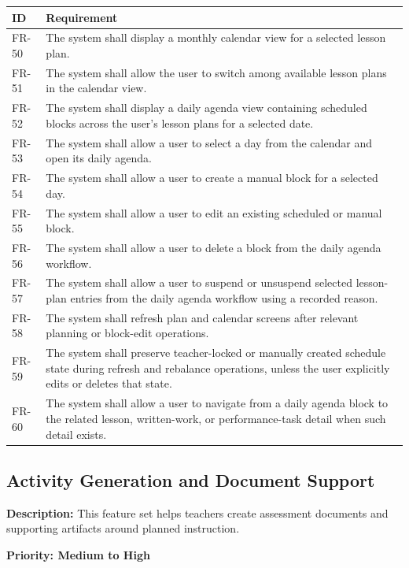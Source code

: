 \documentclass[12pt]{article}
\begin{document}
\begin{longtable}{|L{2.3cm}|L{11.3cm}|}
\hline
\textbf{ID} & \textbf{Requirement} \\
\hline
FR-50 & The system shall display a monthly calendar view for a selected lesson plan. \\
\hline
FR-51 & The system shall allow the user to switch among available lesson plans in the calendar view. \\
\hline
FR-52 & The system shall display a daily agenda view containing scheduled blocks across the user's lesson plans for a selected date. \\
\hline
FR-53 & The system shall allow a user to select a day from the calendar and open its daily agenda. \\
\hline
FR-54 & The system shall allow a user to create a manual block for a selected day. \\
\hline
FR-55 & The system shall allow a user to edit an existing scheduled or manual block. \\
\hline
FR-56 & The system shall allow a user to delete a block from the daily agenda workflow. \\
\hline
FR-57 & The system shall allow a user to suspend or unsuspend selected lesson-plan entries from the daily agenda workflow using a recorded reason. \\
\hline
FR-58 & The system shall refresh plan and calendar screens after relevant planning or block-edit operations. \\
\hline
FR-59 & The system shall preserve teacher-locked or manually created schedule state during refresh and rebalance operations, unless the user explicitly edits or deletes that state. \\
\hline
FR-60 & The system shall allow a user to navigate from a daily agenda block to the related lesson, written-work, or performance-task detail when such detail exists. \\
\hline
\end{longtable}

\subsection{Activity Generation and Document Support}

\textbf{Description:} This feature set helps teachers create assessment documents
and supporting artifacts around planned instruction.

\textbf{Priority: Medium to High}
\end{document}
